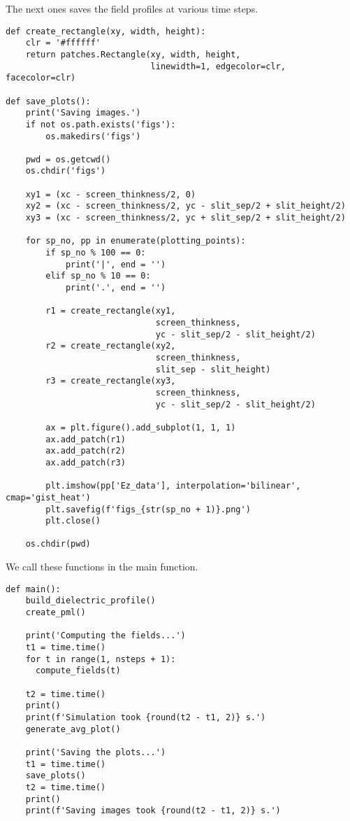 \documentclass[11pt]{article}
\numberwithin{equation}{section}
\begin{document}
The next ones saves the field profiles at various time steps.
\begin{verbatim}
def create_rectangle(xy, width, height):
    clr = '#ffffff'
    return patches.Rectangle(xy, width, height, 
                             linewidth=1, edgecolor=clr, facecolor=clr)

def save_plots():       
    print('Saving images.')
    if not os.path.exists('figs'):
        os.makedirs('figs')    
        
    pwd = os.getcwd()
    os.chdir('figs') 
    
    xy1 = (xc - screen_thinkness/2, 0)
    xy2 = (xc - screen_thinkness/2, yc - slit_sep/2 + slit_height/2)
    xy3 = (xc - screen_thinkness/2, yc + slit_sep/2 + slit_height/2)
    
    for sp_no, pp in enumerate(plotting_points):  
        if sp_no % 100 == 0:
            print('|', end = '')
        elif sp_no % 10 == 0:
            print('.', end = '')
                                  
        r1 = create_rectangle(xy1, 
                              screen_thinkness, 
                              yc - slit_sep/2 - slit_height/2)
        r2 = create_rectangle(xy2, 
                              screen_thinkness, 
                              slit_sep - slit_height)
        r3 = create_rectangle(xy3, 
                              screen_thinkness, 
                              yc - slit_sep/2 - slit_height/2)
        
        ax = plt.figure().add_subplot(1, 1, 1)
        ax.add_patch(r1)
        ax.add_patch(r2)
        ax.add_patch(r3)
    
        plt.imshow(pp['Ez_data'], interpolation='bilinear', cmap='gist_heat')
        plt.savefig(f'figs_{str(sp_no + 1)}.png')
        plt.close()
        
    os.chdir(pwd)
\end{verbatim}
We call these functions in the main function.
\begin{verbatim}
def main():    
    build_dielectric_profile()
    create_pml()
    
    print('Computing the fields...')
    t1 = time.time()
    for t in range(1, nsteps + 1):
      compute_fields(t)
      
    t2 = time.time()
    print()
    print(f'Simulation took {round(t2 - t1, 2)} s.')
    generate_avg_plot()
    
    print('Saving the plots...')
    t1 = time.time()           
    save_plots()  
    t2 = time.time()
    print()
    print(f'Saving images took {round(t2 - t1, 2)} s.') 
\end{verbatim}
\end{document}
